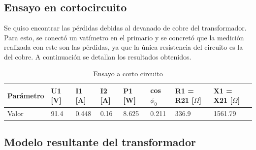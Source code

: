 \documentclass[a4paper]{article}
\begin{document}
\subsection{Ensayo en cortocircuito}
Se quiso encontrar las pérdidas debidas al devanado de cobre del transformador. Para esto, se conectó un vatímetro en el primario y se concretó que la medición realizada con este son las pérdidas, ya que la única resistencia del circuito es la del cobre. A continuación se detallan los resultados obtenidos.
\begin{table}[H]
\centering
\begin{tabular}{|l|l|l|l|l|l|l|l|}
\hline
Parámetro & U1 [V] & I1 [A] & I2 [A] & P1 [W] & cos $\phi_0$  & R1 = R21 [$\Omega$] & X1 = X21 [$\Omega$] \\ \hline
Valor     & 91.4     & 0.448    & 0.16     & 8.625    & 0.211            & 336.9               & 1561.79             \\ \hline
\end{tabular}
\caption {Ensayo a corto circuito}
\centering
\end{table}
\subsection{Modelo resultante del transformador}
\end{document}
